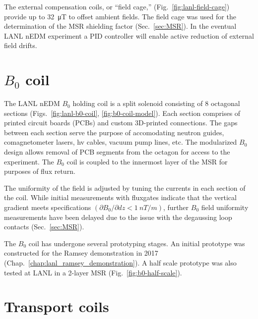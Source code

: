 The external compensation coils, or ``field cage,'' (Fig.~\ref{fig:lanl-field-cage}) provide up to \qty{32}{\micro\tesla} to offset ambient fields. The field cage was used for the determination of the MSR shielding factor (Sec.~\ref{sec:MSR}). In the eventual LANL nEDM experiment a PID controller will enable active reduction of external field drifts.


\section{
    \texorpdfstring{$B_0$ coil}
                {B0 coil}\label{sec:B0_coil}
}


The LANL nEDM $B_0$ holding coil is a split solenoid consisting of 8 octagonal sections (Figs.~\ref{fig:lanl-b0-coil}, \ref{fig:b0-coil-model}). Each section comprises of printed circuit boards (PCBs) and custom 3D-printed connections. The gaps between each section serve the purpose of accomodating neutron guides, comagnetometer lasers, \acrshort*{hv} cables, vacuum pump lines, etc. The modularized $B_0$ design allows removal of PCB segments from the octagon for access to the experiment. The $B_0$ coil is coupled to the innermost layer of the MSR for purposes of flux return. 

The uniformity of the field is adjusted by tuning the currents in each section of the coil. While initial measurements with fluxgates indicate that the vertical gradient meets specifications $(\partial B_0/\partial dz < \qty{1}{nT \per m})$, further $B_0$ field uniformity measurements have been delayed due to the issue with the degaussing loop contacts (Sec.~\ref{sec:MSR}).

The $B_0$ coil has undergone several prototyping stages. An initial prototype was constructed for the Ramsey demonstration in 2017 (Chap.~\ref{chap:lanl_ramsey_demonstration}). A half scale prototype was also tested at LANL in a 2-layer MSR (Fig.~\ref{fig:b0-half-scale}).


\section{Transport coils}


